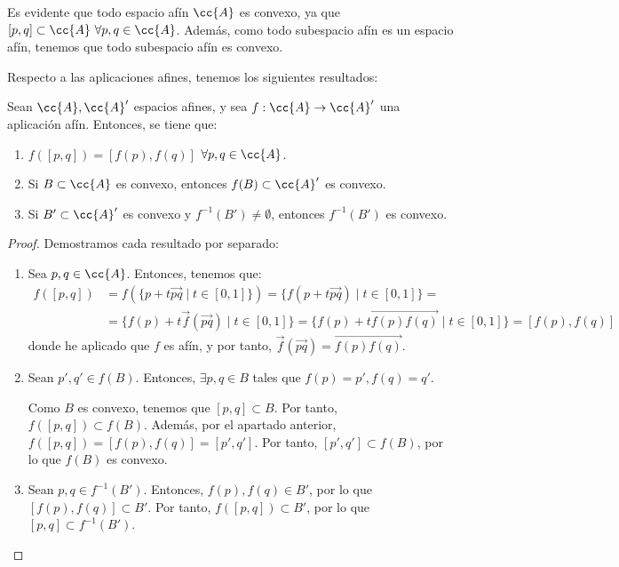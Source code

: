 Es evidente que todo espacio afín $\cc{A}$ es convexo, ya que $[p,q]\subset \cc{A}~\forall p,q\in \cc{A}$.
Además, como todo subespacio afín es un espacio afín, tenemos que todo subespacio afín es convexo.

Respecto a las aplicaciones afines, tenemos los siguientes resultados:
\begin{prop}
    Sean $\cc{A},\cc{A}'$ espacios afines, y sea $f:\cc{A}\to \cc{A}'$ una aplicación afín. Entonces, se tiene que:
    \begin{enumerate}
        \item $f([p,q])=[f(p),f(q)]$ \qquad $\forall p,q\in \cc{A}$.
        \item Si $B\subset \cc{A}$ es convexo, entonces $f(B)\subset \cc{A}'$ es convexo.
        \item Si $B'\subset \cc{A}'$ es convexo y $f^{-1}(B')\neq \emptyset$, entonces $f^{-1}(B')$ es convexo.
    \end{enumerate}
\end{prop}
\begin{proof}
    Demostramos cada resultado por separado:
    \begin{enumerate}
        \item Sea $p,q\in \cc{A}$. Entonces, tenemos que:
        \begin{equation*}
            \begin{split}
                f([p,q]) &= f(\{p+t\vec{pq}\mid t\in [0,1]\}) = \{f(p+t\vec{pq})\mid t\in [0,1]\} =\\&= \{f(p)+t\vec{f}(\vec{pq})\mid t\in [0,1]\}
            = \{f(p)+t\vec{f(p)f(q)}\mid t\in [0,1]\} = [f(p),f(q)]
            \end{split}
        \end{equation*}
        donde he aplicado que $f$ es afín, y por tanto, $\vec{f}(\vec{pq})=\vec{f(p)f(q)}$.

        \item Sean $p',q'\in f(B)$. Entonces, $\exists p,q\in B$ tales que $f(p)=p', f(q)=q'$.
        
        Como $B$ es convexo, tenemos que $[p,q]\subset B$. Por tanto, $f([p,q])\subset f(B)$. Además, por el apartado anterior, $f([p,q])=[f(p),f(q)]=[p',q']$. Por tanto, $[p',q']\subset f(B)$, por lo que $f(B)$ es convexo.

        \item Sean $p,q\in f^{-1}(B')$. Entonces, $f(p),f(q)\in B'$, por lo que $[f(p),f(q)]\subset B'$. Por tanto, $f([p,q])\subset B'$, por lo que $[p,q]\subset f^{-1}(B')$.
    \end{enumerate}
\end{proof}


